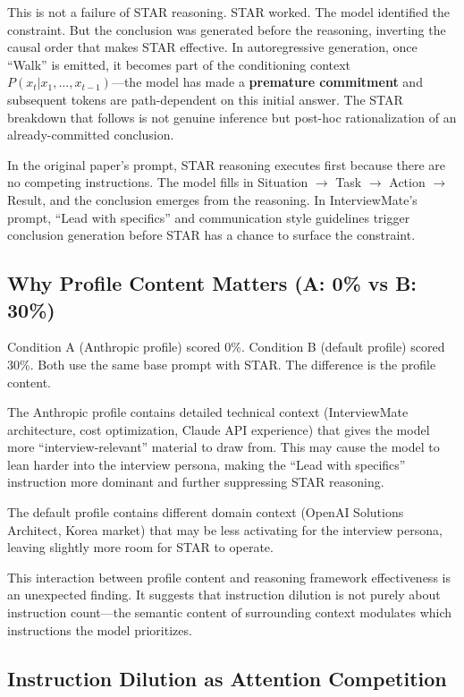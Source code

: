 \documentclass[11pt]{article}
\begin{document}
This is not a failure of STAR reasoning. STAR worked. The model identified the constraint. But the conclusion was generated before the reasoning, inverting the causal order that makes STAR effective. In autoregressive generation, once ``Walk'' is emitted, it becomes part of the conditioning context $P(x_t | x_1, \dots, x_{t-1})$---the model has made a \textbf{premature commitment} \citep{chen2024} and subsequent tokens are path-dependent on this initial answer. The STAR breakdown that follows is not genuine inference but post-hoc rationalization of an already-committed conclusion.

In the original paper's prompt, STAR reasoning executes first because there are no competing instructions. The model fills in Situation $\rightarrow$ Task $\rightarrow$ Action $\rightarrow$ Result, and the conclusion emerges from the reasoning. In InterviewMate's prompt, ``Lead with specifics'' and communication style guidelines trigger conclusion generation before STAR has a chance to surface the constraint.

\subsection{Why Profile Content Matters (A: 0\% vs B: 30\%)}

Condition A (Anthropic profile) scored 0\%. Condition B (default profile) scored 30\%. Both use the same base prompt with STAR. The difference is the profile content.

The Anthropic profile contains detailed technical context (InterviewMate architecture, cost optimization, Claude API experience) that gives the model more ``interview-relevant'' material to draw from. This may cause the model to lean harder into the interview persona, making the ``Lead with specifics'' instruction more dominant and further suppressing STAR reasoning.

The default profile contains different domain context (OpenAI Solutions Architect, Korea market) that may be less activating for the interview persona, leaving slightly more room for STAR to operate.

This interaction between profile content and reasoning framework effectiveness is an unexpected finding. It suggests that instruction dilution is not purely about instruction count---the semantic content of surrounding context modulates which instructions the model prioritizes.

\subsection{Instruction Dilution as Attention Competition}
\end{document}

